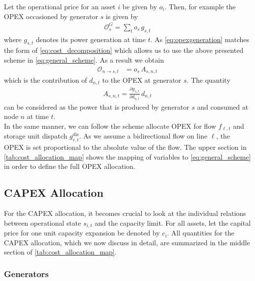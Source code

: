 \documentclass[11pt,twocolumn]{article}
\newcommand{\pdv}[2]{\frac{\partial #1}{\partial #2}}
\newcommand{\state}{s_{i,t}}
\newcommand{\generation}{g_{s,t}}
\newcommand{\operationalpricegeneration}{o_{s}}
\newcommand{\flow}{f_{\ell,t}}
\newcommand{\storage}{g_{r,t}}
\newcommand{\storagedispatch}{\storage^\text{dis}}
\newcommand{\demand}[1][n]{d_{#1,t}}
\newcommand{\allocategeneration}[1][s, n]{A_{#1,t}}
\newcommand{\allocateopex}[1][n \rightarrow s]{\mathcal{O}_{#1,t}}
\newcommand{\opexgeneration}{\mathcal{O}^G}
\begin{document}
Let the operational price for an asset $i$ be given by $o_i$. Then, for example the OPEX occasioned by generator $s$ is given by 
\begin{align}
    \opexgeneration_s = \sum_t \operationalpricegeneration \, \generation 
    \label{eq:opexgeneration}
\end{align}
where $\generation$ denotes its power generation at time $t$. As \cref{eq:opexgeneration} matches the form of \cref{eq:cost_decomposition} which allows us to use the above presented scheme in \cref{eq:general_scheme}. As a result we obtain 
\begin{align}
    \allocateopex[n \rightarrow s] &= 
   \operationalpricegeneration \,  \allocategeneration
\label{eq:allocate_opexGeneration_detailed}
\end{align}
which is the contribution of $\demand$ to the OPEX at generator $s$.
The quantity  
\begin{align}
 \allocategeneration = \pdv{\generation}{\demand} \, \demand
 \label{eq:allocate_peer}
\end{align}
can be considered as the power that is produced by generator $s$ and consumed at node $n$ at time $t$. \\
In the same manner, we can follow the scheme allocate OPEX for flow $\flow$ and storage unit dispatch $\storagedispatch$. As we assume a bidirectional flow on line $\ell$, the OPEX is set proportional to the absolute value of the flow. The upper section in \cref{tab:cost_allocation_map} shows the mapping of variables to \cref{eq:general_scheme} in order to define the full OPEX allocation. 

\subsection{CAPEX Allocation}
For the CAPEX allocation, it becomes crucial to look at the individual relations between operational state $\state$ and the capacity limit. For all assets, let the capital price for one unit capacity expansion be denoted by $c_i$.  All quantities for the CAPEX allocation, which we now discuss in detail, are summarized in the middle section of \cref{tab:cost_allocation_map}.  

\subsubsection{Generators}
\end{document}
